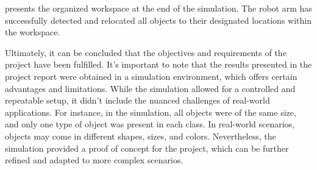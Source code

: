  presents the organized workspace at the end of the simulation. The robot arm has successfully detected and relocated all objects to their designated locations within the workspace.

Ultimately, it can be concluded that the objectives and requirements of the project have been fulfilled. It's important to note that the results presented in the project report were obtained in a simulation environment, which offers certain advantages and limitations. While the simulation allowed for a controlled and repeatable setup, it didn't include the nuanced challenges of real-world applications. For instance, in the simulation, all objects were of the same size, and only one type of object was present in each class. In real-world scenarios, objects may come in different shapes, sizes, and colors. Nevertheless, the simulation provided a proof of concept for the project, which can be further refined and adapted to more complex scenarios.